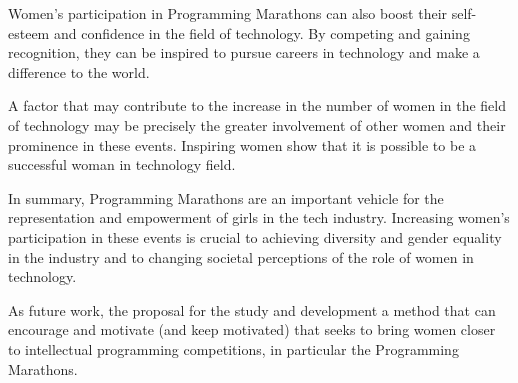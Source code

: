 \documentclass[12pt]{article}
\begin{document}
Women's participation in Programming Marathons can also boost their self-esteem and confidence in the field of technology. By competing and gaining recognition, they can be inspired to pursue careers in technology and make a difference to the world.

A factor that may contribute to the increase in the number of women in the field of technology may be precisely the greater involvement of other women and their prominence in these events. Inspiring women show that it is possible to be a successful woman in technology field.

In summary, Programming Marathons are an important vehicle for the representation and empowerment of girls in the tech industry. Increasing women's participation in these events is crucial to achieving diversity and gender equality in the industry and to changing societal perceptions of the role of women in technology.

As future work, the proposal for the study and development a method that can encourage and motivate (and keep motivated) that seeks to bring women closer to intellectual programming competitions, in particular the Programming Marathons.




\end{document}
